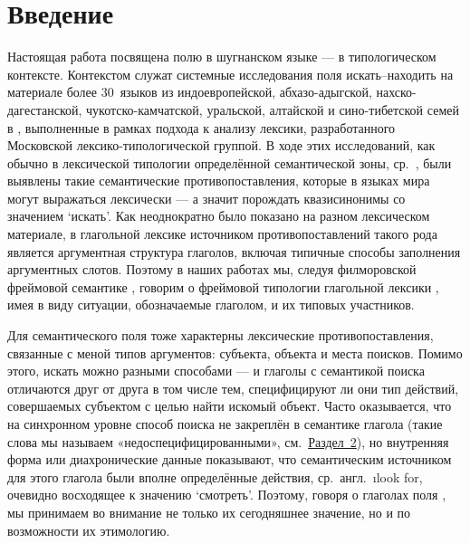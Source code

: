 \begin{initialprint}
\end{initialprint}

\section{Введение} \label{search-intro}

Настоящая работа посвящена полю  в шугнанском языке — в типологическом контексте. Контекстом служат системные исследования поля {\sc искать–находить} на материале более 30~языков из индоевропейской, абхазо-адыгской, нахско-дагестанской, чукотско-камчатской, уральской, алтайской и сино-тибетской семей в \parencite{eureka2018}, выполненные в рамках подхода к анализу лексики, разработанного Московской лексико-типологической группой. В ходе этих исследований, как обычно в лексической типологии определённой семантической зоны, ср.~\parencites{maisak_rakhilina2007}{rakhilina_etal2020}, были выявлены такие семантические противопоставления, которые в языках мира могут выражаться лексически — а значит порождать квазисинонимы со значением ‘искать’. Как неоднократно было показано на разном лексическом материале, в глагольной лексике источником противопоставлений такого рода является аргументная структура глаголов, включая типичные способы заполнения аргументных слотов. Поэтому в наших работах мы, следуя филморовской фреймовой семантике \parencite{fillmore1976}, говорим о \b{фреймовой типологии} глагольной лексики \parencite{rakhilina_reznikova2013}, имея в виду ситуации, обозначаемые глаголом, и их типовых участников.

Для семантического поля  тоже характерны лексические противопоставления, связанные с меной типов аргументов: субъекта, объекта и места поисков. Помимо этого, искать можно разными способами — и глаголы с семантикой поиска отличаются друг от друга в том числе тем, специфицируют ли они тип действий, совершаемых субъектом с целью найти искомый объект. Часто оказывается, что на синхронном уровне способ поиска не закреплён в семантике глагола (такие слова мы называем «недоспецифицированными», см.~\hyperref[search-unspec]{Раздел~2}), но внутренняя форма или диахронические данные показывают, что семантическим источником для этого глагола были вполне определённые действия, ср.~англ.~\i{look for}, очевидно восходящее к значению ‘смотреть’. Поэтому, говоря о глаголах поля , мы принимаем во внимание не только их сегодняшнее значение, но и по возможности их этимологию.

